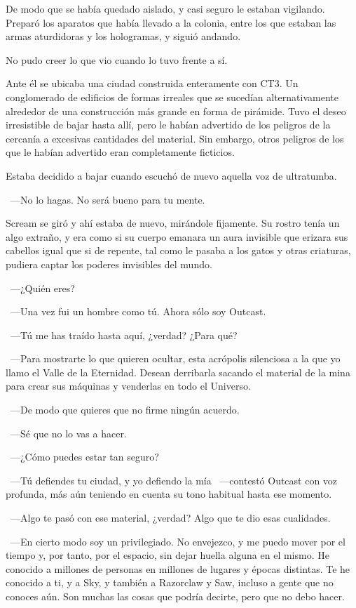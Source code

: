 De modo que se había quedado aislado, y casi seguro le estaban vigilando. Preparó los aparatos que había llevado a la colonia, entre los que estaban las armas aturdidoras y los hologramas, y siguió andando.

No pudo creer lo que vio cuando lo tuvo frente a sí.

Ante él se ubicaba una ciudad construida enteramente con CT3. Un conglomerado de edificios de formas irreales que se sucedían alternativamente alrededor de una construcción más grande en forma de pirámide. Tuvo el deseo irresistible de bajar hasta allí, pero le habían advertido de los peligros de la cercanía a excesivas cantidades del material. Sin embargo, otros peligros de los que le habían advertido eran completamente ficticios.

Estaba decidido a bajar cuando escuchó de nuevo aquella voz de ultratumba.

~---No lo hagas. No será bueno para tu mente.

Scream se giró y ahí estaba de nuevo, mirándole fijamente. Su rostro tenía un algo extraño, y era como si su cuerpo emanara un aura invisible que erizara sus cabellos igual que si de repente, tal como le pasaba a los gatos y otras criaturas, pudiera captar los poderes invisibles del mundo.

~---¿Quién eres?

~---Una vez fui un hombre como tú. Ahora sólo soy Outcast.

~---Tú me has traído hasta aquí, ¿verdad? ¿Para qué?

~---Para mostrarte lo que quieren ocultar, esta acrópolis silenciosa a la que yo llamo el Valle de la Eternidad. Desean derribarla sacando el material de la mina para crear sus máquinas y venderlas en todo el Universo.

~---De modo que quieres que no firme ningún acuerdo.

~---Sé que no lo vas a hacer.

~---¿Cómo puedes estar tan seguro?

~---Tú defiendes tu ciudad, y yo defiendo la mía ~---contestó Outcast con voz profunda, más aún teniendo en cuenta su tono habitual hasta ese momento.

~---Algo te pasó con ese material, ¿verdad? Algo que te dio esas cualidades.

~---En cierto modo soy un privilegiado. No envejezco, y me puedo mover por el tiempo y, por tanto, por el espacio, sin dejar huella alguna en el mismo. He conocido a millones de personas en millones de lugares y épocas distintas. Te he conocido a ti, y a Sky, y también a Razorclaw y Saw, incluso a gente que no conoces aún. Son muchas las cosas que podría decirte, pero que no debo hacer.


